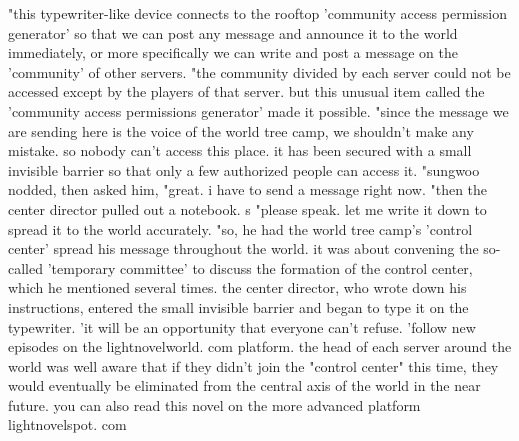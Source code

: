 "this typewriter-like device connects to the rooftop 'community access permission generator' so that we can post any message and announce it to the world immediately, or more specifically we can write and post a message on the 'community' of other servers.
"the community divided by each server could not be accessed except by the players of that server.
 but this unusual item called the 'community access permissions generator' made it possible.
"since the message we are sending here is the voice of the world tree camp, we shouldn't make any mistake.
 so nobody can't access this place.
 it has been secured with a small invisible barrier so that only a few authorized people can access it.
"sungwoo nodded, then asked him, "great.
 i have to send a message right now.
"then the center director pulled out a notebook.
s "please speak.
 let me write it down to spread it to the world accurately.
"so, he had the world tree camp's 'control center' spread his message throughout the world.
 it was about convening the so-called 'temporary committee' to discuss the formation of the control center, which he mentioned several times.
the center director, who wrote down his instructions, entered the small invisible barrier and began to type it on the typewriter.
'it will be an opportunity that everyone can't refuse.
'follow new episodes on the lightnovelworld.
com platform.
the head of each server around the world was well aware that if they didn't join the "control center" this time, they would eventually be eliminated from the central axis of the world in the near future.
 you can also read this novel on the more advanced platform lightnovelspot.
com

 